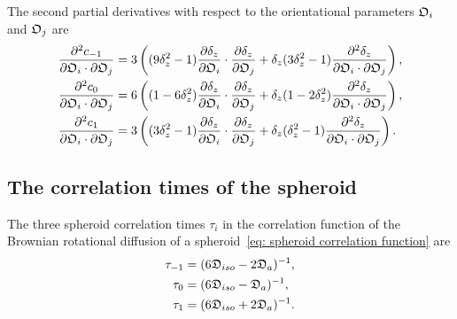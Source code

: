 The second partial derivatives with respect to the orientational parameters $\mathfrak{O}_i$ and $\mathfrak{O}_j$ are
\begin{subequations}
\begin{align}
    \frac{\partial^2 c_{-1}}{\partial \mathfrak{O}_i \cdot \partial \mathfrak{O}_j}  &=  3 \left(
        (9\delta_z^2 - 1) \frac{\partial \delta_z}{\partial \mathfrak{O}_i} \cdot \frac{\partial \delta_z}{\partial \mathfrak{O}_j}
        +  \delta_z (3\delta_z^2 - 1) \frac{\partial^2 \delta_z}{\partial \mathfrak{O}_i \cdot \partial \mathfrak{O}_j} \right), \\
    \frac{\partial^2 c_{0}}{\partial \mathfrak{O}_i \cdot \partial \mathfrak{O}_j}  &=  6 \left(
        (1 - 6\delta_z^2) \frac{\partial \delta_z}{\partial \mathfrak{O}_i} \cdot \frac{\partial \delta_z}{\partial \mathfrak{O}_j}
        +  \delta_z (1 - 2\delta_z^2) \frac{\partial^2 \delta_z}{\partial \mathfrak{O}_i \cdot \partial \mathfrak{O}_j} \right), \\
    \frac{\partial^2 c_{1}}{\partial \mathfrak{O}_i \cdot \partial \mathfrak{O}_j}  &=  3 \left(
        (3\delta_z^2 - 1) \frac{\partial \delta_z}{\partial \mathfrak{O}_i} \cdot \frac{\partial \delta_z}{\partial \mathfrak{O}_j}
        +  \delta_z (\delta_z^2 - 1) \frac{\partial^2 \delta_z}{\partial \mathfrak{O}_i \cdot \partial \mathfrak{O}_j} \right).
\end{align}
\end{subequations}




\newpage
\subsection{The correlation times of the spheroid}

The three spheroid correlation times $\tau_i$ in the correlation function of the Brownian rotational diffusion of a spheroid~\eqref{eq: spheroid correlation function} are
\begin{subequations}
\begin{align}
    \tau_{-1} &= (6\mathfrak{D}_{iso} - 2\mathfrak{D}_a)^{-1}, \\
    \tau_{0}  &= (6\mathfrak{D}_{iso} - \mathfrak{D}_a)^{-1}, \\
    \tau_{1}  &= (6\mathfrak{D}_{iso} + 2\mathfrak{D}_a)^{-1}.
\end{align}
\end{subequations}



